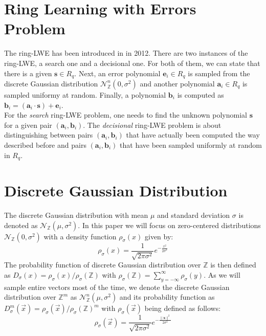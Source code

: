 \section{Ring Learning with Errors Problem}
The \acf{ring-LWE} has been introduced in \cite{cryptoeprint:2012:230} in 2012. There are two instances of the \ac{ring-LWE}, a search one and a decisional one. For both of them, we can state that there is a given \(\textbf{s} \in R_q\). Next, an error polynomial \(\textbf{e}_i \in R_q\) is sampled from the discrete Gaussian distribution \(\mathcal{N}_\mathbb{Z}^{n} (0, \sigma^2)\) and another polynomial \(\textbf{a}_i \in R_q\) is sampled uniformy at random. Finally, a polynomial \(\textbf{b}_i\) is computed as \(\textbf{b}_i = (\textbf{a}_i \cdot \textbf{s}) + \textbf{e}_i\).\\
For the \textit{search} \ac{ring-LWE} problem, one needs to find the unknown polynomial \(\textbf{s}\) for a given pair \((\textbf{a}_i, \textbf{b}_i)\). The \textit{decisional} \ac{ring-LWE} problem is about distinguishing between pairs \((\textbf{a}_i, \textbf{b}_i)\) that have actually been computed the way described before and pairs \((\textbf{a}_i, \textbf{b}_i)\) that have been sampled uniformly at random in \(R_q\).

\section{Discrete Gaussian Distribution}
The discrete Gaussian distribution with mean \(\mu\) and standard deviation \(\sigma\) is denoted as \(\mathcal{N}_\mathbb{Z} (\mu, \sigma^2)\). In this paper we will focus on zero-centered distributions \(\mathcal{N}_\mathbb{Z} (0, \sigma^2)\) with a density function \(\rho_\sigma(x)\) given by:
\begin{equation}
	\rho_\sigma(x)=\frac{1}{\sqrt{2\pi \sigma^2}}e^{-\frac{x^2}{2\sigma^2}}
\end{equation}
The probability function of discrete Gaussian distribution over \(\mathbb{Z}\) is then defined as \(D_\sigma(x)=\rho_\sigma(x)/\rho_\sigma(\mathbb{Z})\) with \(\rho_\sigma(\mathbb{Z})=\sum_{y=-\infty}^{\infty} \rho_\sigma(y)\). As we will sample entire vectors most of the time, we denote the discrete Gaussian distribution over \(\mathbb{Z}^m\) as \(\mathcal{N}_\mathbb{Z}^{n} (\mu, \sigma^2)\) and its probability function as \(D_\sigma^m(\vec{x})=\rho_\sigma(\vec{x})/\rho_\sigma(\mathbb{Z})^m\) with \(\rho_\sigma(\vec{x})\) being defined as follows:
\begin{equation}
	\rho_\sigma(\vec{x})=\frac{1}{\sqrt{2\pi \sigma^2}}e^{-\frac{\|\textbf{x}\|^2}{2\sigma^2}}
\end{equation}

